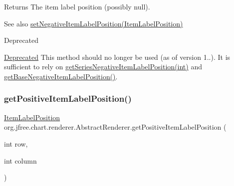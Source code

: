 \begin{DoxyReturn}{Returns}
The item label position (possibly {\ttfamily null}).
\end{DoxyReturn}
\begin{DoxySeeAlso}{See also}
\mbox{\hyperlink{classorg_1_1jfree_1_1chart_1_1renderer_1_1_abstract_renderer_a24fd71d04b101f4636e57eb2d5e60b61}{set\+Negative\+Item\+Label\+Position(\+Item\+Label\+Position)}}
\end{DoxySeeAlso}
\begin{DoxyRefDesc}{Deprecated}
\item[\mbox{\hyperlink{deprecated__deprecated000140}{Deprecated}}]This method should no longer be used (as of version 1..). It is sufficient to rely on \mbox{\hyperlink{classorg_1_1jfree_1_1chart_1_1renderer_1_1_abstract_renderer_a2ec8c993651d531262e314d8b1336756}{get\+Series\+Negative\+Item\+Label\+Position(int)}} and \mbox{\hyperlink{classorg_1_1jfree_1_1chart_1_1renderer_1_1_abstract_renderer_aa258bdeed3dd89d9de396d3c4e65d541}{get\+Base\+Negative\+Item\+Label\+Position()}}. \end{DoxyRefDesc}
\mbox{\label{classorg_1_1jfree_1_1chart_1_1renderer_1_1_abstract_renderer_a6737068cd9f275dae38acd6173a80708}} 
\subsubsection{\texorpdfstring{get\+Positive\+Item\+Label\+Position()}{getPositiveItemLabelPosition()}\hspace{0.1cm}{\footnotesize\ttfamily [1/2]}}
{\footnotesize\ttfamily \mbox{\hyperlink{classorg_1_1jfree_1_1chart_1_1labels_1_1_item_label_position}{Item\+Label\+Position}} org.\+jfree.\+chart.\+renderer.\+Abstract\+Renderer.\+get\+Positive\+Item\+Label\+Position (\begin{DoxyParamCaption}\item[{int}]{row,  }\item[{int}]{column }\end{DoxyParamCaption})}

